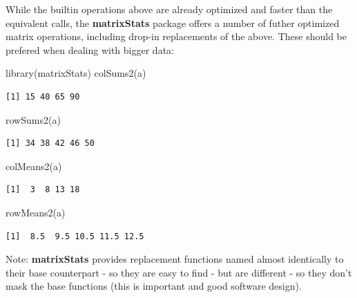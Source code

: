 \documentclass[
]{book}
\newenvironment{Shaded}{\begin{snugshade}}{\end{snugshade}}
\newcommand{\FunctionTok}[1]{\textcolor[rgb]{0.00,0.00,0.00}{#1}}
\newcommand{\NormalTok}[1]{#1}
\begin{document}
While the builtin operations above are already optimized and faster than the equivalent calls, the \textbf{matrixStats} package \citep{matrixStats2019} offers a number of futher optimized matrix operations, including drop-in replacements of the above. These should be prefered when dealing with bigger data:

\begin{Shaded}
\begin{Highlighting}[]
\FunctionTok{library}\NormalTok{(matrixStats)}
\FunctionTok{colSums2}\NormalTok{(a)}
\end{Highlighting}
\end{Shaded}

\begin{verbatim}
[1] 15 40 65 90
\end{verbatim}

\begin{Shaded}
\begin{Highlighting}[]
\FunctionTok{rowSums2}\NormalTok{(a)}
\end{Highlighting}
\end{Shaded}

\begin{verbatim}
[1] 34 38 42 46 50
\end{verbatim}

\begin{Shaded}
\begin{Highlighting}[]
\FunctionTok{colMeans2}\NormalTok{(a)}
\end{Highlighting}
\end{Shaded}

\begin{verbatim}
[1]  3  8 13 18
\end{verbatim}

\begin{Shaded}
\begin{Highlighting}[]
\FunctionTok{rowMeans2}\NormalTok{(a)}
\end{Highlighting}
\end{Shaded}

\begin{verbatim}
[1]  8.5  9.5 10.5 11.5 12.5
\end{verbatim}

Note: \textbf{matrixStats} provides replacement functions named almost identically to their base counterpart - so they are easy to find - but are different - so they don't mask the base functions (this is important and good software design).
\end{document}
